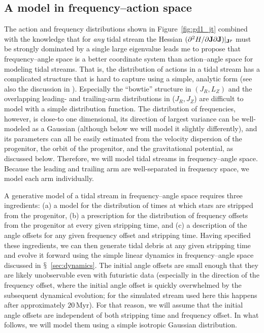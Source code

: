 \documentclass[12pt,preprint]{aastex}
\renewcommand{\figurename}{Figure}
\newcommand{\sectionname}{$\mathsection$}
\renewcommand{\vec}[1]{\ensuremath{\mathbf{#1}}}
\newcommand{\vecj}{\ensuremath{\vec{J}}}
\newcommand{\Myr}{\ensuremath{\,\mathrm{Myr}}}
\begin{document}
\subsection{A model in frequency--action space}\label{sec:modeloa}

The action and frequency distributions shown in
\figurename~\ref{fig:gd1_jt} combined with the knowledge that for
\emph{any} tidal stream the Hessian $(\partial^2 H / \partial \vecj
\partial \vecj)\large|_{\vecj^p}$ must be strongly dominated by a
single large eigenvalue leads me to propose that frequency--angle
space is a better coordinate system than action--angle space for
modeling tidal streams. That is, the distribution of actions in a
tidal stream has a complicated structure that is hard to capture using
a simple, analytic form (see also the discussion in
\citealt{Eyre11a}). Especially the ``bowtie'' structure in $(J_R,L_Z)$
and the overlapping leading- and trailing-arm distributions in
($J_R,J_Z$) are difficult to model with a simple distribution
function. The distribution of frequencies, however, is close-to one
dimensional, its direction of largest variance can be well-modeled as
a Gaussian (although below we will model it slightly differently), and
its parameters can all be easily estimated from the velocity
dispersion of the progenitor, the orbit of the progenitor, and the
gravitational potential, as discussed below. Therefore, we will model
tidal streams in frequency--angle space. Because the leading and
trailing arm are well-separated in frequency space, we model each arm
individually.

A generative model of a tidal stream in frequency--angle space
requires three ingredients: (a) a model for the distribution of times
at which stars are stripped from the progenitor, (b) a prescription
for the distribution of frequency offsets from the progenitor at every
given stripping time, and (c) a description of the angle offsets for
any given frequency offset and stripping time. Having specified these
ingredients, we can then generate tidal debris at any given stripping
time and evolve it forward using the simple linear dynamics in
frequency--angle space discussed in
\sectionname~\ref{sec:dynamics}. The initial angle offsets are small
enough that they are likely unobservable even with futuristic data
(especially in the direction of the frequency offset, where the
initial angle offset is quickly overwhelmed by the subsequent
dynamical evolution; for the simulated stream used here this happens
after approximately $20\Myr$). For that reason, we will assume that
the initial angle offsets are independent of both stripping time and
frequency offset. In what follows, we will model them using a simple
isotropic Gaussian distribution.
\end{document}
